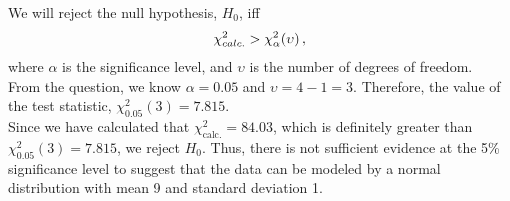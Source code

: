 \begin{subquestions}
\begin{subsubquestions}
We will reject the null hypothesis, $H_0$, iff 
\begin{align}
	\chi^2_{calc.} > \chi^2_{\alpha} (\upsilon) \,, \nonumber 
\end{align}
where $\alpha$ is the significance level, and $\upsilon$ is the number of degrees of freedom. \\

From the question, we know $\alpha= 0.05$ and $\upsilon = 4-1=3$. Therefore, the value of the test statistic, $\chi^2_{0.05}(3)=7.815$.\\
Since we have calculated that $\chi^2_{\text{calc.}} = 84.03$, which is definitely greater than $\chi^2_{0.05}(3)=7.815$, we reject $H_0$. Thus, there is not sufficient evidence at the 5\% significance level to suggest that the data can be modeled by a normal distribution with mean 9 and standard deviation 1.

\end{subsubquestions}

\end{subquestions}


